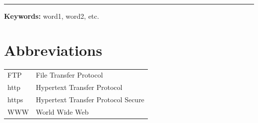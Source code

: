 \documentclass[a4paper, 12pt]{article} %
\begin{document}
\vspace{0.5cm} %
\begin{flushleft}
    \noindent\rule{\textwidth}{0.4pt} %
\vspace{0.5cm}
\textbf{Keywords:} word1, word2, etc. \\
\vspace{2cm}
\end{flushleft}
\newpage

\centering
\renewcommand{\contentsname}{Table of Contents} %
\renewcommand{\cftsecleader}{\cftdotfill{\cftdotsep}} %
\tableofcontents
{} %
\newpage

\listoffigures
\vspace{2cm}

\listoftables
\newpage


{}
\setlength{\cftbeforesecskip}{0pt} 
\listofappendixitems  %
\newpage


\section*{Abbreviations}
\begin{tabularx}{\textwidth}{@{}lX@{}}
    FTP & File Transfer Protocol \\
    http & Hypertext Transfer Protocol \\
    https & Hypertext Transfer Protocol Secure \\
    WWW & World Wide Web \\
\end{tabularx}
\vspace{2cm}
\newpage


\clearpage
{}
\raggedright %











\clearpage
{}
\setcounter{page}{9} %

\centering
\appendix


\centering


\centering



\centering

\end{document}
